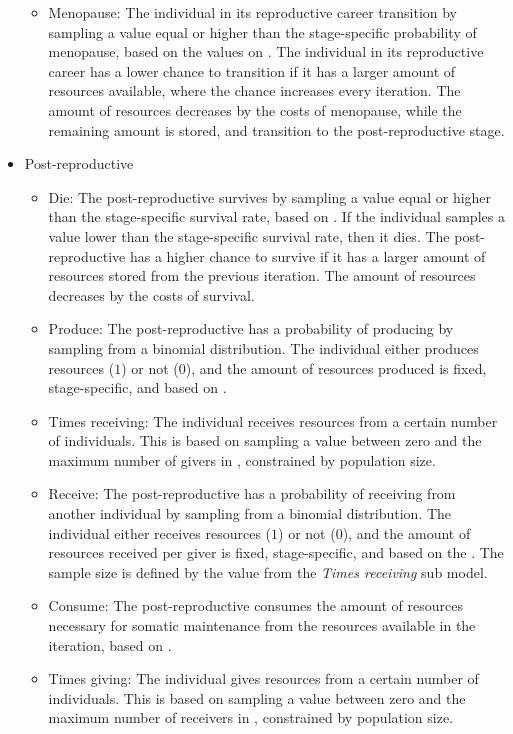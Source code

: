 \documentclass{article}
\begin{document}
\begin{itemize}
\begin{itemize}
        \item Menopause: The individual in its reproductive career transition by sampling a value equal or higher than the stage-specific probability of menopause, based on the values on \citep{laisk2019demographic}. The individual in its reproductive career has a lower chance to transition if it has a larger amount of resources available, where the chance increases every iteration. The amount of resources decreases by the costs of menopause, while the remaining amount is stored, and transition to the post-reproductive stage.
    \end{itemize}
    \item Post-reproductive
    \begin{itemize}
        \item Die: The post-reproductive survives by sampling a value equal or higher than the stage-specific survival rate, based on \cite{gurven2007longevity}. If the individual samples a value lower than the stage-specific survival rate, then it dies. The post-reproductive has a higher chance to survive if it has a larger amount of resources stored from the previous iteration. The amount of resources decreases by the costs of survival.
        \item Produce: The post-reproductive has a probability of producing by sampling from a binomial distribution. The individual either produces resources ($1$) or not ($0$), and the amount of resources produced is fixed, stage-specific, and based on \cite{koster2020life}.
        \item Times receiving: The individual receives resources from a certain number of individuals. This is based on sampling a value between zero and the maximum number of givers in \cite{gurven2004give}, constrained by population size.
        \item Receive: The post-reproductive has a probability of receiving from another individual by sampling from a binomial distribution. The individual either receives resources ($1$) or not ($0$), and the amount of resources received per giver is fixed, stage-specific, and based on the \cite{gurven2004give}. The sample size is defined by the value from the \emph{Times receiving} sub model. 
        \item Consume: The post-reproductive consumes the amount of resources necessary for somatic maintenance from the resources available in the iteration, based on \cite{kaplan2000theory,pontzer2021daily}.
        \item Times giving: The individual gives resources from a certain number of individuals. This is based on sampling a value between zero and the maximum number of receivers in \cite{gurven2004give}, constrained by population size.

\end{itemize}
\end{itemize}
\end{document}
